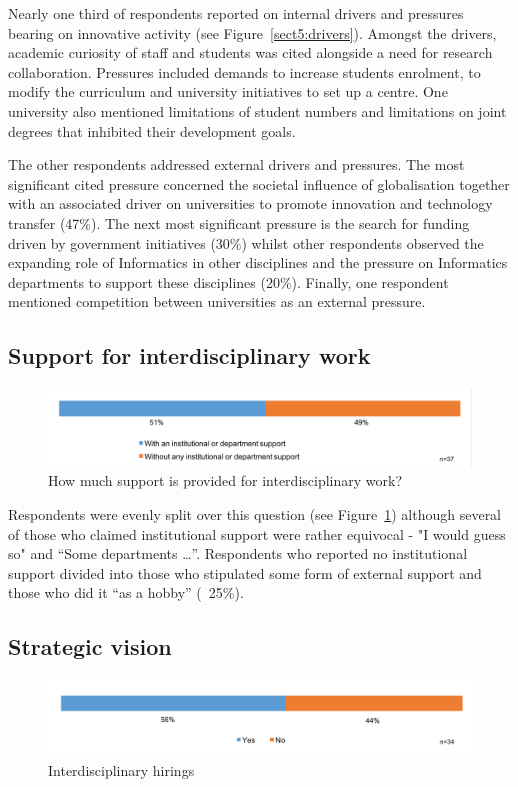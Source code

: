Nearly one third of respondents reported on internal drivers and pressures bearing on innovative activity (see Figure~\ref{sect5:drivers}). Amongst the drivers, academic curiosity of staff and students was cited alongside a need for research collaboration. Pressures included demands to increase students enrolment, to modify the curriculum and university initiatives to set up a centre. One university also mentioned limitations of student numbers and limitations on joint degrees that inhibited their development goals.

The other respondents addressed external drivers and pressures. The most significant cited pressure concerned the societal influence of globalisation together with an associated driver on universities to promote innovation and  technology transfer (47\%).  The next most significant pressure is the search for funding driven by government initiatives (30\%) whilst other respondents observed the expanding role of Informatics in other disciplines and the pressure on Informatics departments to support these disciplines (20\%). Finally, one respondent mentioned competition between universities as an external pressure.

\subsection{Support for interdisciplinary work}

\begin{figure}[h]
\centering
\includegraphics[width = \linewidth]{charts/5h.png}
\caption{How much support is provided for interdisciplinary work?}
\label{sect5:support}
\end{figure}

Respondents were evenly split over this question (see Figure~\ref{sect5:support}) although several of those who claimed institutional support were rather equivocal - "I would guess so" and ``Some departments \ldots ''. Respondents who reported no institutional support divided into those who stipulated some form of external support and those who did it ``as a hobby'' (~25\%).

\subsection{Strategic vision }
\begin{figure}[h]
\centering
\includegraphics[width = \linewidth]{charts/5i.png}
\caption{Interdisciplinary hirings}
\label{sect5:strategy}
\end{figure}

